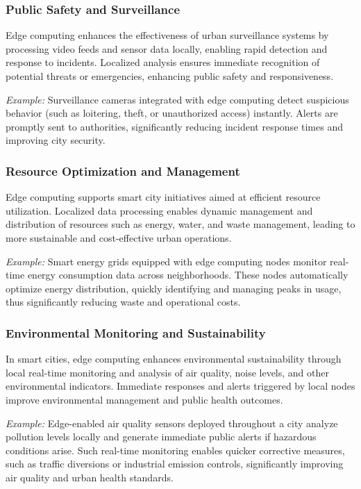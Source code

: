 \documentclass[runningheads]{llncs}
\begin{document}
\subsubsection{Public Safety and Surveillance}
Edge computing enhances the effectiveness of urban surveillance systems by processing video feeds and sensor data locally, enabling rapid detection and response to incidents. Localized analysis ensures immediate recognition of potential threats or emergencies, enhancing public safety and responsiveness.

\textit{Example:} Surveillance cameras integrated with edge computing detect suspicious behavior (such as loitering, theft, or unauthorized access) instantly. Alerts are promptly sent to authorities, significantly reducing incident response times and improving city security.

\subsubsection{Resource Optimization and Management}
Edge computing supports smart city initiatives aimed at efficient resource utilization. Localized data processing enables dynamic management and distribution of resources such as energy, water, and waste management, leading to more sustainable and cost-effective urban operations.

\textit{Example:} Smart energy grids equipped with edge computing nodes monitor real-time energy consumption data across neighborhoods. These nodes automatically optimize energy distribution, quickly identifying and managing peaks in usage, thus significantly reducing waste and operational costs.

\subsubsection{Environmental Monitoring and Sustainability}
In smart cities, edge computing enhances environmental sustainability through local real-time monitoring and analysis of air quality, noise levels, and other environmental indicators. Immediate responses and alerts triggered by local nodes improve environmental management and public health outcomes.

\textit{Example:} Edge-enabled air quality sensors deployed throughout a city analyze pollution levels locally and generate immediate public alerts if hazardous conditions arise. Such real-time monitoring enables quicker corrective measures, such as traffic diversions or industrial emission controls, significantly improving air quality and urban health standards.
\end{document}

